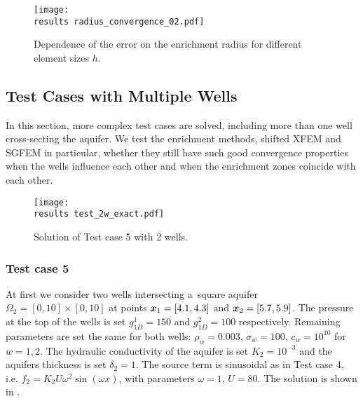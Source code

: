 \begin{figure}[!htb]
  \centering    
  \texttt{[image: \\results radius\_convergence\_02.pdf]}
  \caption[Optimal enrichment radius.]{Dependence of the error on the enrichment radius for different
  element sizes $h$.}
  \label{fig:radius_conv_2}
\end{figure}


\subsection{Test Cases with Multiple Wells}
\label{sec:2d_results_multiple}
In this section, more complex test cases are solved, including more than one well cross-secting the aquifer.
We test the enrichment methods, shifted XFEM and SGFEM in particular, whether they
still have such good convergence properties when the wells influence each other and when the enrichment zones coincide with each other.

%
\begin{figure}[!htb]
  \centering    
    \texttt{[image: \\results test\_2w\_exact.pdf]}
  \caption{Solution of Test case 5 with 2 wells. }
  \label{fig:test_2w_exact}
\end{figure}
\subsubsection{Test case 5}
At first we consider two wells intersecting a~square aquifer $\Omega_2 = [0,10]\times[0, 10]$ at points $\mathbf{\boldsymbol{x}}_1 = [4.1, 4.3]$ and $\mathbf{\boldsymbol{x}}_2 = [5.7, 5.9]$.
The pressure at the top of the wells is set $g^1_{1D}=150$ and $g^2_{1D}=100$ respectively.
Remaining parameters are set the same for both wells: $\rho_w = 0.003$, $\sigma_w = 100$, $c_w = 10^{10}$ for $w=1,2$.
The hydraulic conductivity of the aquifer is set $K_2=10^{-3}$ and the aquifers thickness is set $\delta_2=1$.
The source term is sinusoidal as in Test case 4, i.e. $f_2 = K_2U\omega^2\sin(\omega x)$, with parameters $\omega=1$, $U=80$.
The solution is shown in .

